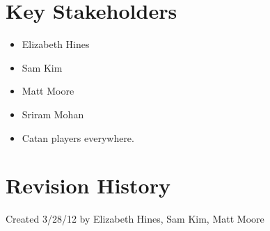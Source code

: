 \documentclass[12pt]{article}
\begin{document}
\section{Key Stakeholders}
\begin{itemize}
\item Elizabeth Hines
\item Sam Kim
\item Matt Moore
\item Sriram Mohan
\item Catan players everywhere.
\end{itemize}
\newpage
\section{Revision History}
Created 3/28/12 by Elizabeth Hines, Sam Kim, Matt Moore
\end{document}
